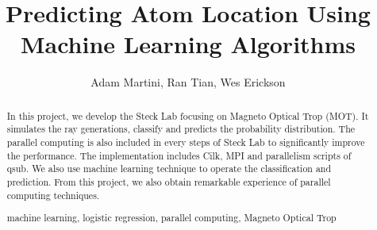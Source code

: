 \documentclass[runningheads,a4paper,11pt]{llncs}
\newcommand{\keywords}[1]{\par\addvspace\baselineskip
\noindent\keywordname\enspace\ignorespaces#1}
\begin{document}
\mainmatter  %

\title{Predicting Atom Location Using \\\vspace{.5em} Machine Learning Algorithms}


%
%
\author{Adam Martini, Ran Tian, Wes Erickson}


%
%

\maketitle

\begin{abstract} In this project, we develop the Steck Lab focusing on Magneto Optical Trop (MOT). It simulates the ray generations, classify and predicts the probability distribution. The parallel computing is also included in every steps of Steck Lab to significantly improve the performance. The implementation includes Cilk, MPI and parallelism scripts of qsub. We also use machine learning technique to operate the classification and prediction. From this project, we also obtain remarkable experience of parallel computing techniques. 
\keywords{machine learning, logistic regression, parallel computing, Magneto Optical Trop}
\end{abstract}

















\end{document}
